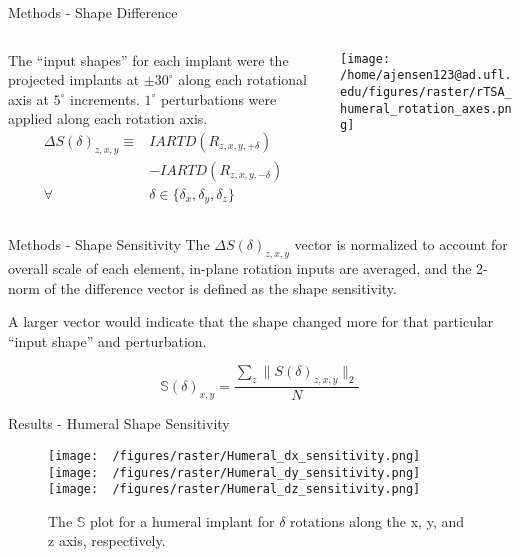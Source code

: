 \documentclass[presentation, aspectratio=1610]{beamer}
\begin{document}
\begin{frame}[label={sec:orge0bb178}]{Methods - Shape Difference}
\begin{columns}
\begin{column}{0.5\columnwidth}
The ``input shapes'' for each implant were the projected implants at \(\pm 30^{\circ}\) along each rotational axis at \(5^{\circ}\) increments.
\(1^{\circ}\) perturbations were applied along each rotation axis.
\begin{equation}
	\label{eq:shape-derivative}
	\begin{split}
		\Delta S(\delta)_{z,x,y}  \equiv & IARTD(R_{z,x,y,+\delta})                        \\
		                                 & - IARTD(R_{z,x,y,-\delta})                      \\
		\forall                          & \delta \in \{\delta_{x},\delta_{y},\delta_{z}\}
	\end{split}
\end{equation}
\end{column}
\begin{column}{0.5\columnwidth}
\begin{center}
\texttt{[image: /home/ajensen123@ad.ufl.edu/figures/raster/rTSA\_humeral\_rotation\_axes.png]}
\end{center}
\end{column}
\end{columns}
\end{frame}
\begin{frame}[label={sec:org3001631}]{Methods - Shape Sensitivity}
The \(\Delta S(\delta)_{z,x,y}\) vector is normalized to account for overall scale of each element, in-plane rotation inputs are averaged, and the 2-norm of the difference vector is defined as the shape sensitivity.

A larger vector would indicate that the shape changed more for that particular ``input shape'' and perturbation.

\begin{equation}
	\label{eq:z_rot_norm}
	\mathbb{S}(\delta)_{x,y} = \dfrac{\sum_{z} \| S(\delta)_{z,x,y} \|_{2}}{N}
\end{equation}
\end{frame}
\begin{frame}[label={sec:org0b75d56}]{Results - Humeral Shape Sensitivity}
\begin{figure}[h!]
	\centering
	\texttt{[image: ~/figures/raster/Humeral\_dx\_sensitivity.png]}
	\texttt{[image: ~/figures/raster/Humeral\_dy\_sensitivity.png]}
	\texttt{[image: ~/figures/raster/Humeral\_dz\_sensitivity.png]}
	\caption{The $\mathbb{S}$ plot for a humeral implant for $\delta$ rotations along the x, y, and z axis, respectively.}
	\label{fig:hum_sensitivity_plot}
\end{figure}
\end{frame}
\end{document}
